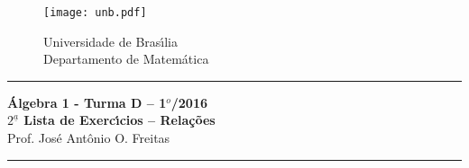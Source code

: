 \documentclass[12pt]{article}
\newcounter{exercicios}
\newcommand{\questao}{
\addtocounter{exercicios}{1}
\noindent{\bf Exerc{\'\i}cio \arabic{exercicios}: }}
\newcommand{\n}{\mathbb{N}}
\begin{document}
\pagestyle{empty}

\begin{figure}[h]
        \begin{minipage}[c]{1.7cm}
        \texttt{[image: unb.pdf]}
        \end{minipage}%
        \hspace{0pt}
        \begin{minipage}[c]{4in}
          {Universidade de Bras{\'\i}lia} \\
          {Departamento de Matem{\'a}tica}
\end{minipage}
\end{figure}
\vspace{-1cm}\hrule

\begin{center}
{\Large\bf {\'A}lgebra 1 - Turma D -- 1$^{o}$/2016} \\ \vspace{9pt} {\large\bf
  $2^{\underline{a}}$ Lista de Exerc{\'\i}cios -- Rela\c{c}\~oes}\\
\vspace{9pt} Prof. Jos{\'e} Ant{\^o}nio O. Freitas
\end{center}
\hrule

\vspace{.6cm}








\end{document}
